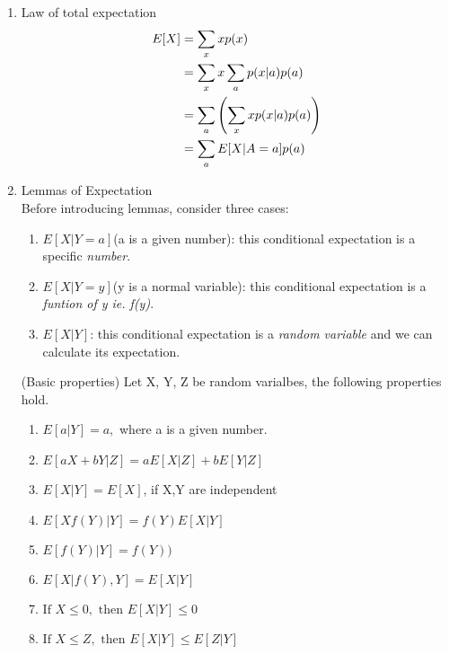 \begin{enumerate}

\item
  Law of total expectation
  \begin{align}
    E[X] &= \sum_{x}xp(x) \notag \\
    &= \sum_{x}x \sum_{a}p(x|a)p(a) \notag \\
    &= \sum_{a}\left(\sum_{x}xp(x|a)p(a)\right) \notag \\
    &= \sum_{a}E[X|A=a]p(a)
  \end{align}
\item
  Lemmas of Expectation \\ Before introducing lemmas, consider three cases:
  \begin{enumerate}

  \item
    $E[X|Y=a]$(a is a given number): this conditional expectation is a specific \textit{number}.
  \item
    $E[X|Y=y]$(y is a normal variable): this conditional expectation is a \textit{funtion of y ie. f(y)}.
  \item
    $E[X|Y]$: this conditional expectation is a \textit{random variable} and we can calculate its expectation.

  \end{enumerate}
  \begin{lemma}{(Basic properties)}
    \label{le2}
    Let X, Y, Z be random varialbes, the following properties hold.
    \begin{enumerate}

    \item
      $E[a|Y]=a,$ where a is a given number.
    \item
      $E[aX+bY|Z]= aE[X|Z]+bE[Y|Z]$
    \item
      $E[X|Y]=E[X]$, if X,Y are independent
    \item
      $E[Xf(Y)|Y] = f(Y)E[X|Y]$
    \item
      $E[f(Y)|Y]=f(Y))$
    \item
      $E[X|f(Y),Y]=E[X|Y]$
    \item
      $\text{If }X \le 0, \text{ then }E[X|Y] \le 0$
    \item
      $\text{If }X \le Z, \text{ then }E[X|Y] \le E[Z|Y]$

    \end{enumerate}


\end{lemma}
\end{enumerate}
